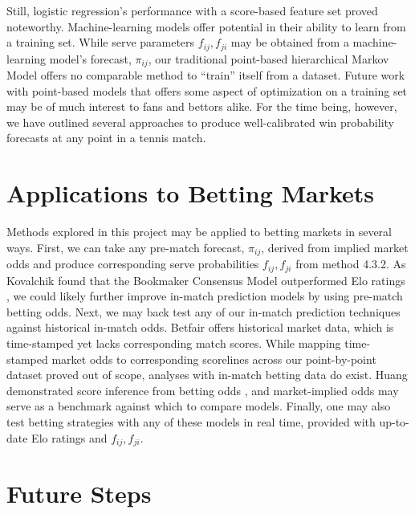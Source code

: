 \documentclass[chapterprefix=false]{report}
\begin{document}
Still, logistic regression's performance with a score-based feature set proved noteworthy. Machine-learning models offer potential in their ability to learn from a training set. While serve parameters $f_{ij},f_{ji}$ may be obtained from a machine-learning model's forecast, $\pi_{ij}$, our traditional point-based hierarchical Markov Model offers no comparable method to ``train'' itself from a dataset. Future work with point-based models that offers some aspect of optimization on a training set may be of much interest to fans and bettors alike. For the time being, however, we have outlined several approaches to produce well-calibrated win probability forecasts at any point in a tennis match.

\section{Applications to Betting Markets}

Methods explored in this project may be applied to betting markets in several ways. First, we can take any pre-match forecast, $\pi_{ij}$, derived from implied market odds and produce corresponding serve probabilities $f_{ij},f_{ji}$ from method 4.3.2. As Kovalchik found that the Bookmaker Consensus Model outperformed Elo ratings \cite{Kovalchik2016}, we could likely further improve in-match prediction models by using pre-match betting odds. Next, we may back test any of our in-match prediction techniques against historical in-match odds. Betfair offers historical market data, which is time-stamped yet lacks corresponding match scores. While mapping time-stamped market odds to corresponding scorelines across our point-by-point dataset proved out of scope, analyses with in-match betting data do exist. Huang demonstrated score inference from betting odds \cite{Huang2011}, and market-implied odds may serve as a benchmark against which to compare models. Finally, one may also test betting strategies with any of these models in real time, provided with up-to-date Elo ratings and $f_{ij},f_{ji}$.



\section{Future Steps}
\end{document}
